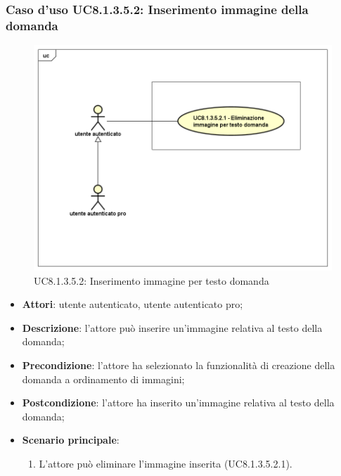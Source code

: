 \subsubsection{Caso d'uso UC8.1.3.5.2: Inserimento immagine della domanda}
\label{UC8.1.3.5.2}
\begin{figure}[h]
	\centering
	\includegraphics[scale=0.45,keepaspectratio]{UML/UC8_1_3_5_2.png}
	\caption{UC8.1.3.5.2: Inserimento immagine per testo domanda}
\end{figure}
\FloatBarrier
\begin{itemize}
	\item\textbf{Attori}: utente autenticato, utente autenticato pro;
	\item\textbf{Descrizione}: l'attore può inserire un'immagine relativa al testo della domanda;
	\item\textbf{Precondizione}: l'attore ha selezionato la funzionalità di creazione della domanda a ordinamento di immagini; 
	\item \textbf{Postcondizione}: l'attore ha inserito un'immagine relativa al testo della domanda;
	\item\textbf{Scenario principale}: 
		\begin{enumerate}
			\item L'attore può eliminare l'immagine inserita (UC8.1.3.5.2.1).
		\end{enumerate}
\end{itemize}

